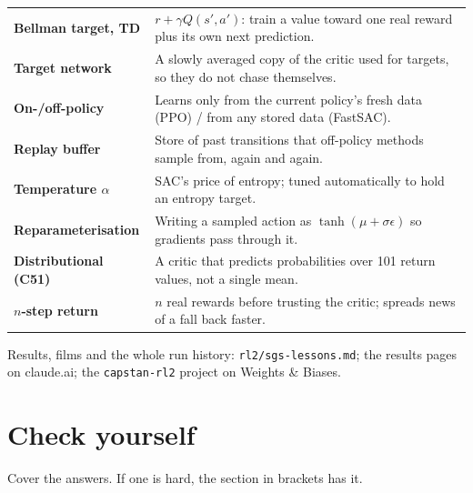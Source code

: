 \documentclass[10pt,letterpaper]{article}
\begin{document}
\begin{small}
\begin{tabularx}{\linewidth}{@{}>{\bfseries}p{3.4cm}X@{}}
Bellman target, TD & $r+\gamma Q(s',a')$: train a value toward one real reward plus its own next prediction. \\
Target network & A slowly averaged copy of the critic used for targets, so they do not chase themselves. \\
On-/off-policy & Learns only from the current policy's fresh data (PPO) / from any stored data (FastSAC). \\
Replay buffer & Store of past transitions that off-policy methods sample from, again and again. \\
Temperature $\alpha$ & SAC's price of entropy; tuned automatically to hold an entropy target. \\
Reparameterisation & Writing a sampled action as $\tanh(\mu+\sigma\epsilon)$ so gradients pass through it. \\
Distributional (C51) & A critic that predicts probabilities over 101 return values, not a single mean. \\
$n$-step return & $n$ real rewards before trusting the critic; spreads news of a fall back faster. \\ \bottomrule
\end{tabularx}
\end{small}

\vspace{4pt}
{\small\color{Ink2} Results, films and the whole run history: \texttt{rl2/sgs-lessons.md}; the results pages on claude.ai; the
\texttt{capstan-rl2} project on Weights \& Biases.}

\section{Check yourself}

Cover the answers. If one is hard, the section in brackets has it.
\end{document}
